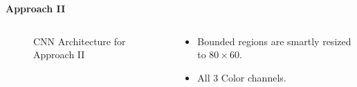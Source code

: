 \begin{frame}{\textbf{Approach II}}
\begin{columns}
	\begin{column}{0.6\textwidth}
	\begin{figure}
		\centering
		\caption{CNN Architecture for Approach II}
	\end{figure}
	\end{column}
	\begin{column}{0.4\textwidth}
		\begin{itemize}
			\item Bounded regions are smartly resized to $80 \times 60$.
			\item All 3 Color channels.
		\end{itemize}
	\end{column}
\end{columns}
\end{frame}

